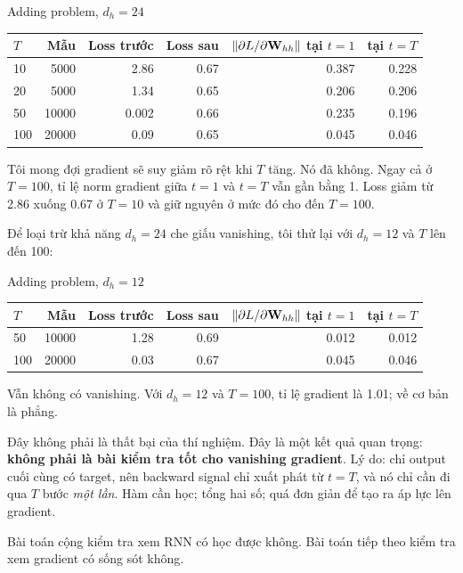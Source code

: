 \begin{measured}{Adding problem, $d_h = 24$}
\small
\begin{tabular}{@{}lrrrrr@{}}
\toprule
$T$ & Mẫu & Loss trước & Loss sau &
$\|\partial L / \partial \mathbf{W}_{hh}\|$ tại $t=1$ & tại $t=T$ \\
\midrule
10  & 5000  & 2.86 & 0.67 & 0.387 & 0.228 \\
20  & 5000  & 1.34 & 0.65 & 0.206 & 0.206 \\
50  & 10000 & 0.002 & 0.66 & 0.235 & 0.196 \\
100 & 20000 & 0.09 & 0.65 & 0.045 & 0.046 \\
\bottomrule
\end{tabular}
\normalsize
\end{measured}

Tôi mong đợi gradient sẽ suy giảm rõ rệt khi $T$ tăng. Nó đã không. Ngay cả
ở $T = 100$, tỉ lệ norm gradient giữa $t=1$ và $t=T$ vẫn gần bằng 1. Loss
giảm từ 2.86 xuống 0.67 ở $T=10$ và giữ nguyên ở mức đó cho đến $T=100$.

Để loại trừ khả năng $d_h = 24$ che giấu vanishing, tôi thử lại với $d_h
= 12$ và $T$ lên đến 100:

\begin{measured}{Adding problem, $d_h = 12$}
\small
\begin{tabular}{@{}lrrrrr@{}}
\toprule
$T$ & Mẫu & Loss trước & Loss sau &
$\|\partial L / \partial \mathbf{W}_{hh}\|$ tại $t=1$ & tại $t=T$ \\
\midrule
50  & 10000 & 1.28 & 0.69 & 0.012 & 0.012 \\
100 & 20000 & 0.03 & 0.67 & 0.045 & 0.046 \\
\bottomrule
\end{tabular}
\normalsize
\end{measured}

Vẫn không có vanishing. Với $d_h = 12$ và $T = 100$, tỉ lệ gradient là
1.01; về cơ bản là phẳng.

Đây không phải là thất bại của thí nghiệm. Đây là một kết quả quan trọng:
\textbf{ không phải là bài kiểm tra tốt cho
vanishing gradient}.
Lý do: chỉ output cuối cùng có target, nên backward signal chỉ xuất phát từ
$t = T$, và nó chỉ cần đi qua $T$ bước \emph{một lần}. Hàm cần học; tổng hai
số; quá đơn giản để tạo ra áp lực lên gradient.

Bài toán cộng kiểm tra xem RNN có học được không. Bài toán tiếp theo kiểm tra
xem gradient có sống sót không.

%
